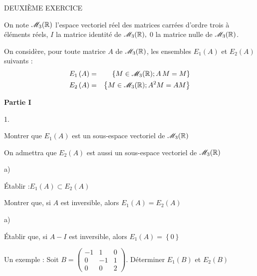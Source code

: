 \documentclass[11pt]{article}%
\begin{document}
\begin{center}
{\LARGE DEUXI\`{E}ME EXERCICE}
\end{center}

On note $\mathscr{M}_{3}(\mathbb{R}) $ l'espace vectoriel réel des matrices carrées d'ordre
trois à éléments réels, $I$ la matrice identité de $\mathscr{M}_{3}(\mathbb{R}),$ $0$
la matrice nulle de $\mathscr{M}_{3}(\mathbb{R}) $.

On considère, pour toute matrice $A$ de $\mathscr{M}_{3}(\mathbb{R}) $, les ensembles
$E_{1}\left( A\right) $ et $E_{2}\left( A\right) $
suivants : 
\begin{eqnarray*}
E_{1}\left( A\right) & = & \left\{ M\in \mathscr{M}_{3}(\mathbb{R})
;A\,M = M\right\} \\
E_{2}\left( A\right) & = & \left\{ M\in \mathscr{M}_{3}(\mathbb{R})
;A^{2}M = AM\right\}
\end{eqnarray*}

\begin{center}
\textbf{Partie I}
\end{center}

\begin{noliste}{1.}
 \setlength{\itemsep}{4mm}
\item Montrer que $E_{1}\left( A\right) $ est un sous-espace vectoriel
de $\mathscr{M}_{3}(\mathbb{R}) $

On admettra que $E_{2}\left( A\right) $ est aussi un sous-espace
vectoriel
de $\mathscr{M}_{3}(\mathbb{R}) $

\item 
\begin{noliste}{a)}
 \setlength{\itemsep}{2mm}
\item Établir :\quad $E_{1}\left( A\right) \subset E_{2}\left( A\right)
$

\item Montrer que, si $A$ est inversible, alors $E_{1}\left( A\right)
 = E_{2}\left( A\right) $
\end{noliste}

\item 
\begin{noliste}{a)}
 \setlength{\itemsep}{2mm}
\item Établir que, si $A-I$ est inversible, alors $E_{1}\left( A\right)
 = \left\{ 0\right\} $

\item Un exemple : Soit $B = \left( 
\begin{array}{rrr}
-1 & 1 & 0 \\
0 & -1 & 1 \\
0 & 0 & 2
\end{array}
\right).$ Déterminer $E_{1}\left( B\right) $ et $E_{2}\left( B\right) $
\end{noliste}
\end{noliste}
\end{document}
